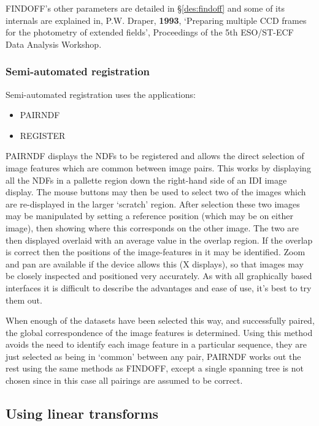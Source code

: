 FINDOFF's other parameters are detailed in \S\ref{des:findoff} and some
of its internals are explained in, P.W. Draper, {\bf 1993}, `Preparing
multiple CCD frames for the photometry of extended fields', Proceedings
of the 5th ESO/ST-ECF Data Analysis Workshop.

\subsubsection{Semi-automated registration}

Semi-automated registration uses the applications:
\begin{itemize}
\item PAIRNDF
\item REGISTER
\end{itemize}

PAIRNDF displays the NDFs to be registered and allows the direct
selection of image features which are common between image pairs.  This
works by displaying all the NDFs in a pallette region down the
right-hand side of an IDI image display. The mouse buttons may then be
used to select two of the images which are re-displayed in the larger
`scratch' region. After selection these two images may be manipulated by
setting a reference position (which may be on either image), then
showing  where this corresponds on the other image. The two are then
displayed overlaid with an average value in the overlap region. If the
overlap is correct then the positions of the image-features in it may be
identified. Zoom and pan are available if the device allows this (X
displays), so that images may be closely inspected and positioned very
accurately. As with all graphically based interfaces it is difficult to
describe the advantages and ease of use, it's best to try them out.

When enough of the datasets have been selected this way, and
successfully paired, the global correspondence of the image features is
determined. Using this method avoids the need to identify each image
feature in a particular sequence, they are just selected as being in
`common' between any pair, PAIRNDF works out the rest using the same
methods as FINDOFF, except a single spanning tree is not chosen since
in this case all pairings are assumed to be correct.

\subsection{Using linear transforms}

